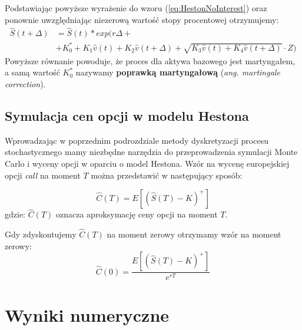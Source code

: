 \documentclass{pracamgr}
\begin{document}
Podstawiając powyższe wyrażenie do wzoru (\ref{eq:HestonNoInterest}) oraz ponownie uwzględniając
niezerową wartość stopy procentowej otrzymujemy:
\begin{equation}
\begin{aligned}
\label{eq:HestonInterestMartingale} 
\hat{S}(t + \Delta) &= \hat{S}(t) * exp(r \Delta+\\ 
                    &+ K_0^* + K_1 \hat{v}(t) 
                    + K_2 \hat{v}(t+\Delta)
                    + \sqrt{K_3 \hat{v}(t) +  K_4 \hat{v}(t+\Delta)} \cdot Z)

\end{aligned}
\end{equation}
Powyższe równanie powoduje, że proces dla aktywa bazowego jest martyngałem, a samą
wartość $K_0^*$ nazywamy \textbf{poprawką martyngałową} (\textit{ang. martingale correction}).


\section{Symulacja cen opcji w modelu Hestona}

Wprowadzając w poprzednim podrozdziale metody dyskretyzacji procesu stochastycznego mamy niezbędne 
narzędzia do przeprowadzenia symulacji Monte Carlo i wyceny opcji w oparciu o model 
Hestona.
Wzór na wycenę europejskiej opcji \textit{call} na moment $T$ można przedstawić w następujący sposób:

\begin{equation}
  \hat{C}(T) = E \left[ (\hat{S}(T) - K)^{+}  \right]
\end{equation}
gdzie: $\hat{C}(T)$ oznacza aproksymację ceny opcji na moment $T$.


Gdy zdyskontujemy $\hat{C}(T)$ na moment zerowy otrzymamy wzór na moment zerowy:
\begin{equation}
\label{eq:monteCarloMean}
  \hat{C}(0) = \frac{E \left[ (\hat{S}(T) - K)^{+} \right]}{e^{rT}} 
\end{equation}





\chapter{Wyniki numeryczne}\label{r:sp}
\end{document}
